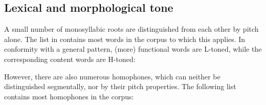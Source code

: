 \subsection{Lexical and morphological tone}

A small number of monosyllabic roots are distinguished from each other by pitch alone. The list in  contains most words in the corpus to which this applies. In conformity with a general pattern, (more) functional words are L-toned, while the corresponding content words are H-toned: 


However, there are also numerous homophones, which can neither be distinguished segmentally, nor by their pitch properties. The following list contains most homophones in the corpus: 


